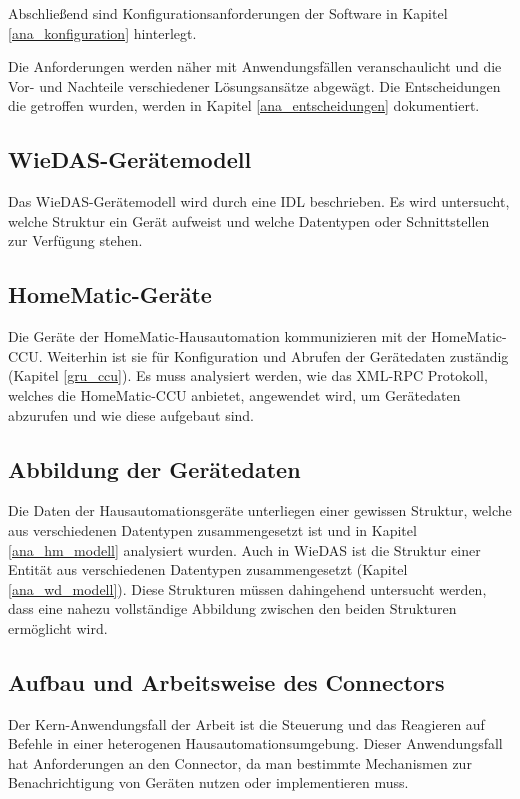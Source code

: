 Abschließend sind Konfigurationsanforderungen der Software in Kapitel \ref{ana_konfiguration} hinterlegt.

Die Anforderungen werden näher mit Anwendungsfällen veranschaulicht und die Vor- und Nachteile
verschiedener Lösungsansätze abgewägt.
Die Entscheidungen die getroffen wurden, werden in Kapitel \ref{ana_entscheidungen} dokumentiert.

\subsection{WieDAS-Gerätemodell}

Das WieDAS-Gerätemodell wird durch eine IDL beschrieben.
Es wird untersucht, welche Struktur ein Gerät aufweist und welche Datentypen oder Schnittstellen
zur Verfügung stehen.

\subsection{HomeMatic-Geräte}

Die Geräte der HomeMatic-Hausautomation kommunizieren mit der HomeMatic-CCU.
Weiterhin ist sie für Konfiguration und Abrufen der Gerätedaten zuständig (Kapitel \ref{gru_ccu}).
Es muss analysiert werden, wie das XML-RPC Protokoll, welches die HomeMatic-CCU anbietet,
angewendet wird, um Gerätedaten abzurufen und wie diese aufgebaut sind.

\subsection{Abbildung der Gerätedaten}

Die Daten der Hausautomationsgeräte unterliegen einer gewissen Struktur, welche aus verschiedenen
Datentypen zusammengesetzt ist und in Kapitel \ref{ana_hm_modell} analysiert wurden.
Auch in WieDAS ist die Struktur einer Entität aus verschiedenen Datentypen zusammengesetzt (Kapitel \ref{ana_wd_modell}).
Diese Strukturen müssen dahingehend untersucht werden, dass eine nahezu vollständige Abbildung
zwischen den beiden Strukturen ermöglicht wird.

\subsection{Aufbau und Arbeitsweise des Connectors}

Der Kern-Anwendungsfall der Arbeit ist die Steuerung und das Reagieren auf Befehle in einer
heterogenen Hausautomationsumgebung.
Dieser Anwendungsfall hat Anforderungen an den Connector, da man bestimmte Mechanismen zur
Benachrichtigung von Geräten nutzen oder implementieren muss.

